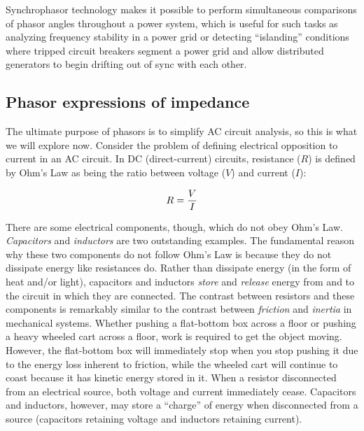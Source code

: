 Synchrophasor technology makes it possible to perform simultaneous comparisons of phasor angles throughout a power system, which is useful for such tasks as analyzing frequency stability in a power grid or detecting ``islanding'' conditions where tripped circuit breakers segment a power grid and allow distributed generators to begin drifting out of sync with each other.










\filbreak
\subsection{Phasor expressions of impedance}

The ultimate purpose of phasors is to simplify AC circuit analysis, so this is what we will explore now.  Consider the problem of defining electrical opposition to current in an AC circuit.  In DC (direct-current) circuits, resistance ($R$) is defined by Ohm's Law as being the ratio between voltage ($V$) and current ($I$):

$$R = {V \over I}$$

There are some electrical components, though, which do not obey Ohm's Law.  \textit{Capacitors} and \textit{inductors} are two outstanding examples.  The fundamental reason why these two components do not follow Ohm's Law is because they do not dissipate energy like resistances do.  Rather than dissipate energy (in the form of heat and/or light), capacitors and inductors \textit{store} and \textit{release} energy from and to the circuit in which they are connected.  The contrast between resistors and these components is remarkably similar to the contrast between \textit{friction} and \textit{inertia} in mechanical systems.  Whether pushing a flat-bottom box across a floor or pushing a heavy wheeled cart across a floor, work is required to get the object moving.  However, the flat-bottom box will immediately stop when you stop pushing it due to the energy loss inherent to friction, while the wheeled cart will continue to coast because it has kinetic energy stored in it.  When a resistor disconnected from an electrical source, both voltage and current immediately cease.  Capacitors and inductors, however, may store a ``charge'' of energy when disconnected from a source (capacitors retaining voltage and inductors retaining current).

\vskip 10pt

